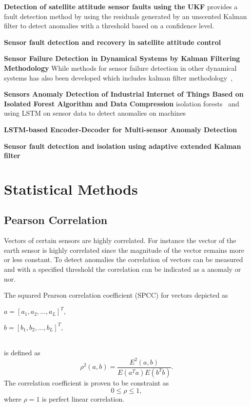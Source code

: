 \textbf{Detection of satellite attitude sensor faults using the UKF}
\cite{Xiong2007} provides a fault detection method by using the residuals generated by an unscented Kalman filter to detect anomalies with a threshold based on a confidence level. 


\textbf{Sensor fault detection and recovery in satellite attitude control}
\cite{Nasrolahi2018} 

\textbf{Sensor Failure Detection in Dynamical Systems by Kalman Filtering Methodology}
While methods for sensor failure detection in other dynamical systems has also been developed which includes kalman filter methodology~\cite{Ciftciogl1991},

\textbf{Sensors Anomaly Detection of Industrial Internet of Things Based on Isolated Forest Algorithm and Data Compression}
isolation forests~\cite{Liu2021} and using LSTM on sensor data to detect anomalies on machines 

\textbf{LSTM-based Encoder-Decoder for Multi-sensor Anomaly Detection}
\cite{Malhotra2016}

\textbf{Sensor fault detection and isolation using adaptive extended Kalman filter}
\cite{van2012sensor}

\section{Statistical Methods}
\subsection{Pearson Correlation}
Vectors of certain sensors are highly correlated. For instance the vector of the earth sensor is highly correlated since the magnitude of the vector remains more or less constant. To detect anomalies the correlation of vectors can be measured and with a specified threshold the correlation can be indicated as a anomaly or nor.

The squared Pearson correlation coefficient (SPCC) for vectors depicted as
\linebreak
\\
\centerline{$a = [a_1, a_2, \ldots, a_L]^T,$}
\linebreak
\centerline{$b = [b_1, b_2, \ldots, b_L]^T,$}
\\
is defined as \cite{benesty2009pearson}
\begin{equation}
	\rho^2 (a,b) = \frac{E^2 (a,b)}{E(a^Ta)E(b^Tb)}.
\end{equation}
The correlation coefficient is proven to be constraint as
\begin{equation}
	0 \leq \rho \leq 1,
\end{equation}
where $\rho = 1$ is perfect linear correlation. 

